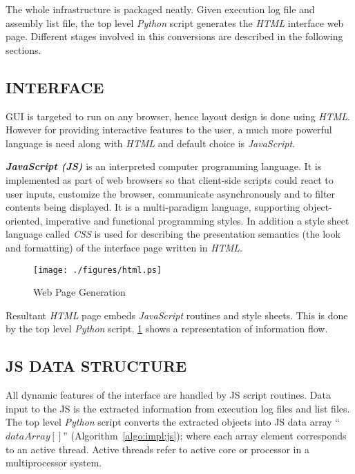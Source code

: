 The whole infrastructure is packaged neatly. Given execution log file and assembly list file, the top level {\it Python} script generates the {\it HTML} interface web page. Different stages involved in this conversions are described in the following sections. 

\subsection {INTERFACE}
GUI is targeted to run on any browser, hence layout design is done using {\it HTML}. However for providing interactive features to the user, a much more powerful language is need along with {\it HTML} and default choice is {\it JavaScript}.

\emph {\bf JavaScript (JS)} is an interpreted computer programming language. It is  implemented as part of web browsers so that client-side scripts could react to user inputs, customize the browser, communicate asynchronously and to filter contents being displayed. It is a multi-paradigm language, supporting object-oriented, imperative and functional programming styles.  
In addition a style sheet language called {\it CSS} is used for describing the presentation semantics (the look and formatting) of the interface page written in {\it HTML}.

\begin{figure}[h]
\centering
\texttt{[image: ./figures/html.ps]}
\caption{Web Page Generation}
\label{fig:html.ps}
\end{figure}

Resultant {\it HTML} page embeds {\it JavaScript} routines and style sheets. This is done by the top level {\it Python} script. \figurename{\ref{fig:html.ps}} shows a representation of information flow.


\subsection{JS DATA STRUCTURE}
All dynamic features of the interface are handled by JS script routines. Data input to the JS is the extracted information from execution log files and list files. The top level {\it Python} script converts the extracted objects into JS data array ``$dataArray[]$'' (Algorithm~\ref{algo:impl:js}); where each array element corresponds to an active thread. Active threads refer to active core or processor in a multiprocessor system.  

